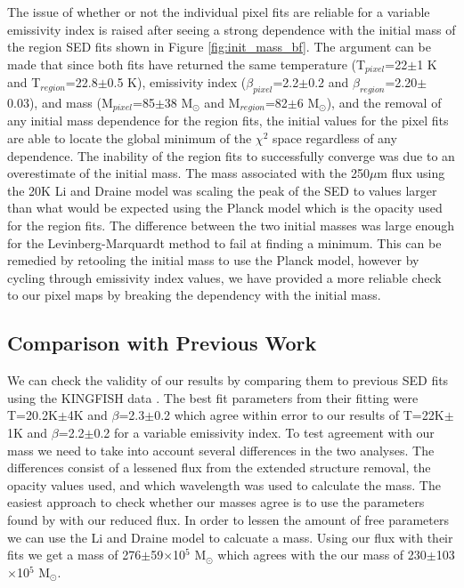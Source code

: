 The issue of whether or not the individual pixel fits are reliable for a variable emissivity index is raised after seeing a strong dependence with the initial mass of the region SED fits shown in Figure \ref{fig:init_mass_bf}.  The argument can be made that since both fits have returned the same temperature (T$_{pixel}$=22$\pm$1 K and T$_{region}$=22.8$\pm$0.5 K), emissivity index ($\beta_{pixel}$=2.2$\pm$0.2 and $\beta_{region}$=2.20$\pm$0.03), and mass (M$_{pixel}$=85$\pm$38 M$_\odot$ and M$_{region}$=82$\pm$6 M$_\odot$), and the removal of any initial mass dependence for the region fits, the initial values for the pixel fits are able to locate the global minimum of the $\chi^2$ space regardless of any dependence.  The inability of the region fits to successfully converge was due to an overestimate of the initial mass.  The mass associated with the 250$\mu$m flux using the 20K Li and Draine model was scaling the peak of the SED to values larger than what would be expected using the Planck model which is the opacity used for the region fits.  The difference between the two initial masses was large enough for the Levinberg-Marquardt method to fail at finding a minimum.  This can be remedied by retooling the initial mass to use the Planck model, however by cycling through emissivity index values, we have provided a more reliable check to our pixel maps by breaking the dependency with the initial mass.

\subsection{Comparison with Previous Work}

We can check the validity of our results by comparing them to previous SED fits using the KINGFISH data \citep{galametz2012}.  The best fit parameters from their fitting were T=20.2K$\pm$4K and $\beta$=2.3$\pm$0.2 which agree within error to our results of T=22K$\pm$1K and $\beta$=2.2$\pm$0.2 for a variable emissivity index.  To test agreement with our mass we need to take into account several differences in the two analyses. The differences consist of a lessened flux from the extended structure removal, the opacity values used, and which wavelength was used to calculate the mass.  The easiest approach to check whether our masses agree is to use the parameters found by \cite{galametz2012} with our reduced flux.  In order to lessen the amount of free parameters we can use the Li and Draine model to calcuate a mass.  Using our flux with their fits we get a mass of 276$\pm$59$\times$10$^{5}$ M$_\odot$ which agrees with the our mass of 230$\pm$103$\times$10$^5$ M$_\odot$.


